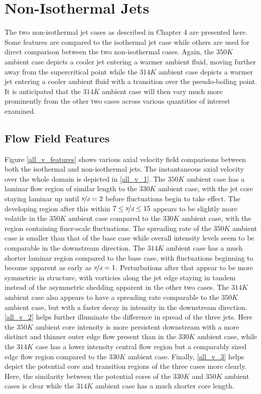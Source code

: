 \section{Non-Isothermal Jets}
The two non-isothermal jet cases as described in Chapter 4 are presented here. Some features are compared to the isothermal jet case while others are used for direct comparison between the two non-isothermal cases. Again, the $350 K$ ambient case depicts a cooler jet entering a warmer ambient fluid, moving further away from the supercritical point while the $314 K$ ambient case depicts a warmer jet entering a cooler ambient fluid with a transition over the pseudo-boiling point. It is anticipated that the $314 K$ ambient case will then vary much more prominently from the other two cases across various quantities of interest examined. 
\subsection{Flow Field Features}
Figure \ref{all_v_features} shows various axial velocity field comparisons between both the isothermal and non-isothermal jets. The instantaneous axial velocity over the whole domain is depicted in \ref{all_v_1}. The $350 K$ ambient case has a laminar flow region of similar length to the $330 K $ ambient case, with the jet core staying laminar up until $\nicefrac{y}{d} = 2$ before fluctuations begin to take effect. The developing region after this within $7 \leq \nicefrac{y}{d} \leq 15$ appears to be slightly more volatile in the $350 K$ ambient case compared to the $330 K$ ambient case, with the region containing finer-scale fluctuations. The spreading rate of the $350 K$ ambient case is smaller than that of the base case while overall intensity levels seem to be comparable in the downstream direction. The $314 K$ ambient case has a much shorter laminar region compared to the base case, with fluctuations beginning to become apparent as early as $\nicefrac{y}{d} = 1$. Perturbations after that appear to be more symmetric in structure, with vorticies along the jet edge staying in tandem instead of the asymmetric shedding apparent in the other two cases. The $314 K$ ambient case also appears to have a spreading rate comparable to the $350 K$ ambient case, but with a faster decay in intensity in the downstream direction. \ref{all_v_2} helps further illuminate the difference in spread of the three jets. Here the $350 K$ ambient core intensity is more persistent downstream with a more distinct and thinner outer edge flow present than in the $330 K$ ambient case, while the $314 K$ case has a lower intensity central flow region but a comparably sized edge flow region compared to the $330 K$ ambient case. Finally, \ref{all_v_3} helps depict the potential core and transition regions of the three cases more clearly. Here, the similarity between the potential cores of the $330 K$ and $350 K$ ambient cases is clear while the $314 K$ ambient case has a much shorter core length. 

